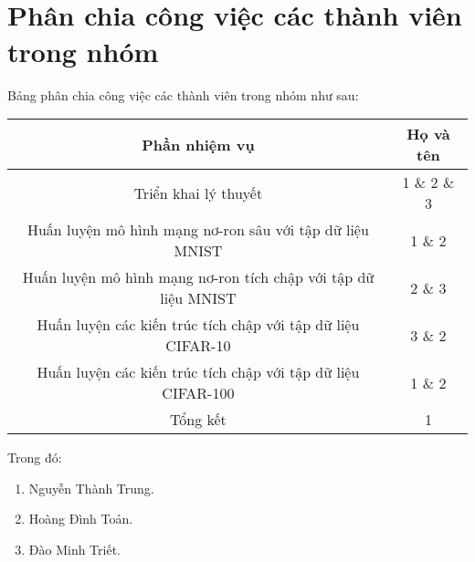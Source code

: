 \appendix

\section*{\\Phân chia công việc các thành viên trong nhóm}

Bảng phân chia công việc các thành viên trong nhóm như sau:

\begin{table}[h!]
\centering
\begin{tabular}{|| c | c ||}
\hline
Phần nhiệm vụ               & Họ và tên             \\ \hline
Triển khai lý thuyết & 1 \& 2 \& 3 \\ \hline
Huấn luyện mô hình mạng nơ-ron sâu với tập dữ liệu MNIST    & 1 \& 2 \\ \hline
Huấn luyện mô hình mạng nơ-ron tích chập với tập dữ liệu MNIST  & 2 \& 3             \\ \hline
Huấn luyện các kiến trúc tích chập với tập dữ liệu CIFAR-10    & 3 \& 2           \\ \hline
Huấn luyện các kiến trúc tích chập với tập dữ liệu CIFAR-100    & 1 \& 2           \\ \hline
Tổng kết    & 1           \\ \hline
\end{tabular}
\end{table}

Trong đó:
\begin{enumerate}
    \item Nguyễn Thành Trung.
    \item Hoàng Đình Toản.
    \item Đào Minh Triết.
\end{enumerate}